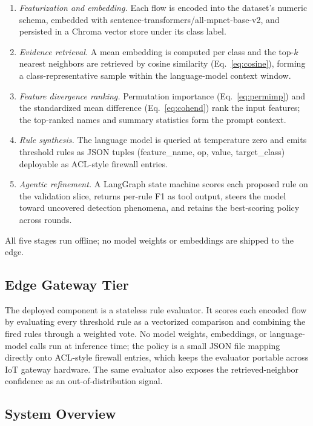 \begin{enumerate}
  \item \textit{Featurization and embedding.} Each flow is encoded into the dataset's numeric schema, embedded with sentence-transformers/all-mpnet-base-v2, and persisted in a Chroma vector store under its class label.
  \item \textit{Evidence retrieval.} A mean embedding is computed per class and the top-$k$ nearest neighbors are retrieved by cosine similarity (Eq.~\ref{eq:cosine}), forming a class-representative sample within the language-model context window.
  \item \textit{Feature divergence ranking.} Permutation importance (Eq.~\ref{eq:permimp}) and the standardized mean difference (Eq.~\ref{eq:cohend}) rank the input features; the top-ranked names and summary statistics form the prompt context.
  \item \textit{Rule synthesis.} The language model is queried at temperature zero and emits threshold rules as JSON tuples (feature\_name, op, value, target\_class) deployable as ACL-style firewall entries.
  \item \textit{Agentic refinement.} A LangGraph state machine scores each proposed rule on the validation slice, returns per-rule F1 as tool output, steers the model toward uncovered detection phenomena, and retains the best-scoring policy across rounds.
\end{enumerate}
All five stages run offline; no model weights or embeddings are shipped to the
edge.

\subsection{Edge Gateway Tier}
\label{subsec:online}

The deployed component is a stateless rule evaluator. It scores each encoded
flow by evaluating every threshold rule as a vectorized comparison and
combining the fired rules through a weighted vote. No model weights, embeddings,
or language-model calls run at inference time; the policy is a small JSON file
mapping directly onto ACL-style firewall entries, which keeps the evaluator
portable across IoT gateway hardware. The same evaluator also exposes the
retrieved-neighbor confidence as an out-of-distribution signal.

\subsection{System Overview}
\label{subsec:overview}

